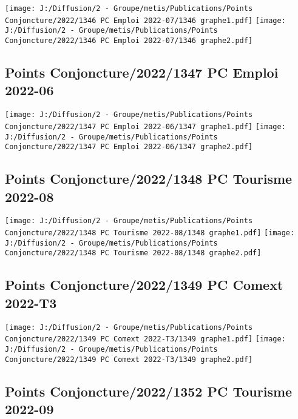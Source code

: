 \documentclass[
]{article}
\begin{document}
\texttt{[image: J:/Diffusion/2 - Groupe/metis/Publications/Points Conjoncture/2022/1346 PC Emploi 2022-07/1346 graphe1.pdf]}
\texttt{[image: J:/Diffusion/2 - Groupe/metis/Publications/Points Conjoncture/2022/1346 PC Emploi 2022-07/1346 graphe2.pdf]}

\hypertarget{points-conjoncture20221347-pc-emploi-2022-06}{%
\subsection{Points Conjoncture/2022/1347 PC Emploi
2022-06}\label{points-conjoncture20221347-pc-emploi-2022-06}}

\texttt{[image: J:/Diffusion/2 - Groupe/metis/Publications/Points Conjoncture/2022/1347 PC Emploi 2022-06/1347 graphe1.pdf]}
\texttt{[image: J:/Diffusion/2 - Groupe/metis/Publications/Points Conjoncture/2022/1347 PC Emploi 2022-06/1347 graphe2.pdf]}

\hypertarget{points-conjoncture20221348-pc-tourisme-2022-08}{%
\subsection{Points Conjoncture/2022/1348 PC Tourisme
2022-08}\label{points-conjoncture20221348-pc-tourisme-2022-08}}

\texttt{[image: J:/Diffusion/2 - Groupe/metis/Publications/Points Conjoncture/2022/1348 PC Tourisme 2022-08/1348 graphe1.pdf]}
\texttt{[image: J:/Diffusion/2 - Groupe/metis/Publications/Points Conjoncture/2022/1348 PC Tourisme 2022-08/1348 graphe2.pdf]}

\hypertarget{points-conjoncture20221349-pc-comext-2022-t3}{%
\subsection{Points Conjoncture/2022/1349 PC Comext
2022-T3}\label{points-conjoncture20221349-pc-comext-2022-t3}}

\texttt{[image: J:/Diffusion/2 - Groupe/metis/Publications/Points Conjoncture/2022/1349 PC Comext 2022-T3/1349 graphe1.pdf]}
\texttt{[image: J:/Diffusion/2 - Groupe/metis/Publications/Points Conjoncture/2022/1349 PC Comext 2022-T3/1349 graphe2.pdf]}

\hypertarget{points-conjoncture20221352-pc-tourisme-2022-09}{%
\subsection{Points Conjoncture/2022/1352 PC Tourisme
2022-09}\label{points-conjoncture20221352-pc-tourisme-2022-09}}
\end{document}
